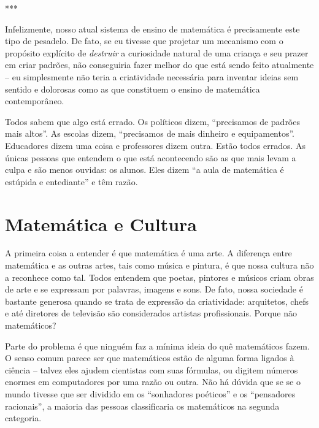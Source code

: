 \documentclass[a4paper,oneside,10pt,notitlepage]{article}
\begin{document}
\vspace{1em}

\begin{center}
***
\end{center}

\vspace{1em}

Infelizmente, nosso atual sistema de ensino de matemática é precisamente este tipo de pesadelo.
De fato, se eu tivesse que projetar um mecanismo com o propósito explícito de \textsl{destruir} a curiosidade natural de uma criança e seu prazer em criar padrões, não conseguiria fazer melhor do que está sendo feito atualmente -- eu simplesmente não teria a criatividade necessária para inventar ideias sem sentido e dolorosas como as que constituem o ensino de matemática contemporâneo.

Todos sabem que algo está errado.
Os políticos dizem, ``precisamos de padrões mais altos''.
As escolas dizem, ``precisamos de mais dinheiro e equipamentos''.
Educadores dizem uma coisa e professores dizem outra.
Estão todos errados.
As únicas pessoas que entendem o que está acontecendo são as que mais levam a culpa e são menos ouvidas: os alunos.
Eles dizem ``a aula de matemática é estúpida e entediante'' e têm razão.

\section*{Matemática e Cultura}

A primeira coisa a entender é que matemática é uma arte.
A diferença entre matemática e as outras artes, tais como música e pintura, é que nossa cultura não a reconhece como tal.
Todos entendem que poetas, pintores e músicos criam obras de arte e se expressam por palavras, imagens e sons.
De fato, nossa sociedade é bastante generosa quando se trata de expressão da criatividade: arquitetos, chefs e até diretores de televisão são considerados artistas profissionais. %
Porque não matemáticos?

Parte do problema é que ninguém faz a mínima ideia do quê matemáticos fazem.
O senso comum parece ser que matemáticos estão de alguma forma ligados à ciência -- talvez eles ajudem cientistas com suas fórmulas, ou digitem números enormes em computadores por uma razão ou outra.
Não há dúvida que se se o mundo tivesse que ser dividido em os ``sonhadores poéticos'' e os ``pensadores racionais'', a maioria das pessoas classificaria os matemáticos na segunda categoria.
\end{document}

